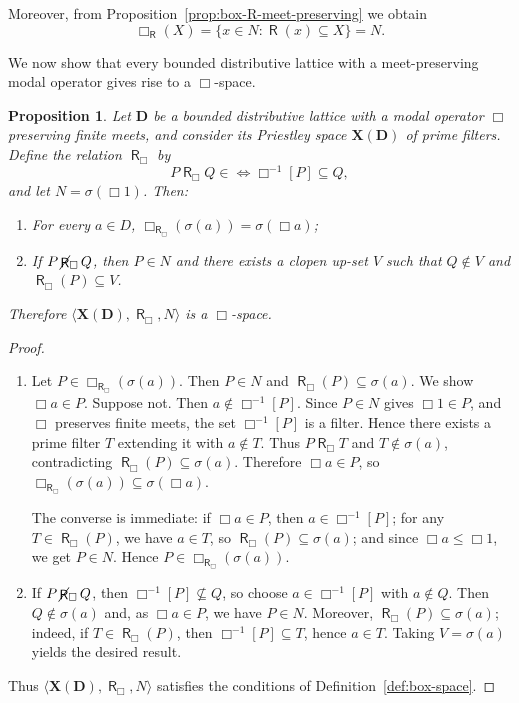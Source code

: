 \documentclass{article}
\newtheorem{proposition}[theorem]{Proposition}
\DeclareMathOperator{\R}{\mathsf{R}}
\DeclareMathOperator{\notR}{\cancel{ \R}}
\newcommand{\D}{\mathbf{D}}
\newcommand{\X}{\mathbf{X}}
\begin{document}
Moreover, from Proposition~\ref{prop:box-R-meet-preserving} we obtain
\[
\Box_{\R}(X) = \{x \in N : \R(x) \subseteq X\} = N.
\]

We now show that every bounded distributive lattice with a meet-preserving modal operator gives rise to a $\Box$-space.

\begin{proposition}
\label{prop:XD-box-space}
Let $\D$ be a bounded distributive lattice with a modal operator $\Box$ preserving finite meets, and consider its Priestley space $\X(\D)$ of prime filters. Define the relation $\R_\Box$ by
\[
P\R_\Box Q \in  \iff \Box^{-1}[P] \subseteq Q,
\]
and let $N = \sigma(\Box 1)$. Then:
\begin{enumerate}
    \item For every $a \in D$, $\Box_{\R_\Box}(\sigma(a)) = \sigma(\Box a)$;
    \item If $P\notR_\Box Q$, then $P \in N$ and there exists a clopen up-set $V$ such that $Q \notin V$ and $\R_\Box(P) \subseteq V$.
\end{enumerate}
Therefore $\langle \X(\D), \R_\Box, N \rangle$ is a $\Box$-space.
\end{proposition}
\begin{proof}
\begin{enumerate}
    \item Let $P \in \Box_{\R_\Box}(\sigma(a))$. Then $P \in N$ and $\R_\Box(P) \subseteq \sigma(a)$. We show $\Box a \in P$. Suppose not. Then $a \notin \Box^{-1}[P]$. Since $P \in N$ gives $\Box 1 \in P$, and $\Box$ preserves finite meets, the set $\Box^{-1}[P]$ is a filter. Hence there exists a prime filter $T$ extending it with $a \notin T$. Thus $P \R_\Box T$ and $T \notin \sigma(a)$, contradicting $\R_\Box(P) \subseteq \sigma(a)$. Therefore $\Box a \in P$, so $\Box_{\R_\Box}(\sigma(a)) \subseteq \sigma(\Box a)$.

    The converse is immediate: if $\Box a \in P$, then $a \in \Box^{-1}[P]$; for any $T \in \R_\Box(P)$, we have $a \in T$, so $\R_\Box(P) \subseteq \sigma(a)$; and since $\Box a \leq \Box 1$, we get $P \in N$. Hence $P \in \Box_{\R_\Box}(\sigma(a))$.

    \item If $P\notR_\Box Q$, then $\Box^{-1}[P] \not\subseteq Q$, so choose $a \in \Box^{-1}[P]$ with $a \notin Q$. Then $Q \notin \sigma(a)$ and, as $\Box a \in P$, we have $P \in N$. Moreover, $\R_\Box(P) \subseteq \sigma(a)$; indeed, if $T \in \R_\Box(P)$, then $\Box^{-1}[P] \subseteq T$, hence $a \in T$. Taking $V = \sigma(a)$ yields the desired result.
\end{enumerate}
Thus $\langle \X(\D), \R_\Box, N \rangle$ satisfies the conditions of Definition~\ref{def:box-space}.
\end{proof}
\end{document}
